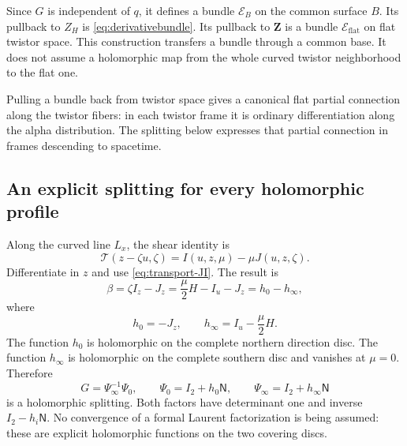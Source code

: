 \documentclass[11pt]{article}
\numberwithin{equation}{section}
\theoremstyle{definition}
\theoremstyle{remark}
\newcommand{\flatZ}{\mathbf Z}
\newcommand{\NN}{\mathsf N}
\newcommand{\II}{I_2}
\newcommand{\calT}{\mathcal T}
\begin{document}
Since $G$ is independent of $q$, it defines a bundle $\mathcal E_B$ on the common surface $B$. Its pullback to $Z_H$ is \eqref{eq:derivativebundle}. Its pullback to $\flatZ$ is a bundle $\mathcal E_{\mathrm{flat}}$ on flat twistor space. This construction transfers a bundle through a common base. It does not assume a holomorphic map from the whole curved twistor neighborhood to the flat one.

Pulling a bundle back from twistor space gives a canonical flat partial connection along the twistor fibers: in each twistor frame it is ordinary differentiation along the alpha distribution. The splitting below expresses that partial connection in frames descending to spacetime.

\subsection{An explicit splitting for every holomorphic profile}

Along the curved line $L_x$, the shear identity is
\begin{equation}\label{eq:shear-on-line}
\calT(z-\zeta u,\zeta)=I(u,z,\mu)-\mu J(u,z,\zeta).
\end{equation}
Differentiate in $z$ and use \eqref{eq:transport-JI}. The result is
\begin{equation}\label{eq:betasplit}
\beta=\zeta I_z-J_z=\frac\mu2H-I_u-J_z=h_0-h_\infty,
\end{equation}
where
\begin{equation}\label{eq:h}
h_0=-J_z,\qquad h_\infty=I_u-\frac\mu2H.
\end{equation}
The function $h_0$ is holomorphic on the complete northern direction disc. The function $h_\infty$ is holomorphic on the complete southern disc and vanishes at $\mu=0$. Therefore
\begin{equation}\label{eq:factor}
G=\Psi_\infty^{-1}\Psi_0,
\qquad \Psi_0=\II+h_0\NN,
\qquad \Psi_\infty=\II+h_\infty\NN
\end{equation}
is a holomorphic splitting. Both factors have determinant one and inverse $\II-h_i\NN$. No convergence of a formal Laurent factorization is being assumed: these are explicit holomorphic functions on the two covering discs.
\end{document}

